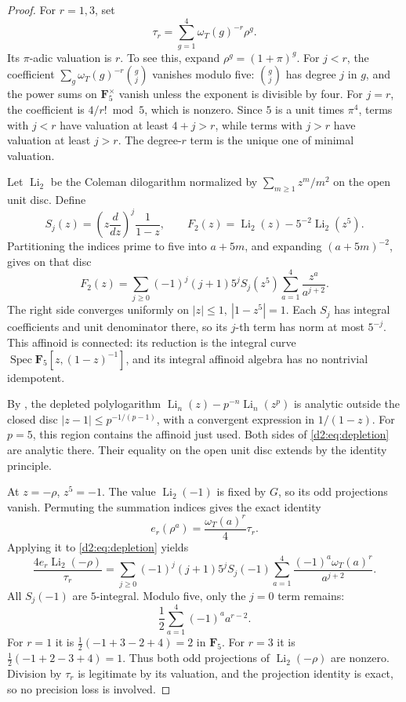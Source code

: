 \documentclass[11pt,a4paper]{amsart}
\numberwithin{equation}{section}
\theoremstyle{definition}
\theoremstyle{remark}
\newcommand{\DtwoFF}{\mathbf{F}}
\newcommand{\DtwoSpec}{\operatorname{Spec}}
\DeclareMathOperator{\DtwoLi}{Li}
\begin{document}
\begin{proof}
For \(r=1,3\), set
\[
 \tau_r=\sum_{g=1}^4\omega_T(g)^{-r}\rho^g.
\]
Its \(\pi\)-adic valuation is \(r\).
To see this, expand \(\rho^g=(1+\pi)^g\).
For \(j<r\), the coefficient
\(\sum_g\omega_T(g)^{-r}\binom gj\) vanishes modulo five:
\(\binom gj\) has degree \(j\) in \(g\), and the power sums on
\(\DtwoFF_5^\times\) vanish unless the exponent is divisible by four.
For \(j=r\), the coefficient is \(4/r!\bmod5\), which is nonzero.
Since \(5\) is a unit times \(\pi^4\), terms with \(j<r\)
have valuation at least \(4+j>r\), while terms with \(j>r\)
have valuation at least \(j>r\).
The degree-\(r\) term is the unique one of minimal valuation.

Let \(\DtwoLi_2\) be the Coleman dilogarithm normalized by
\(\sum_{m\ge1}z^m/m^2\) on the open unit disc.
Define
\[
 S_j(z)=\left(z\frac d{dz}\right)^j\frac1{1-z},
 \qquad
 F_2(z)=\DtwoLi_2(z)-5^{-2}\DtwoLi_2(z^5).
\]
Partitioning the indices prime to five into \(a+5m\), and expanding
\((a+5m)^{-2}\), gives on that disc
\begin{equation}\label{d2:eq:depletion}
 F_2(z)=
 \sum_{j\ge0}(-1)^j(j+1)5^jS_j(z^5)
       \sum_{a=1}^4\frac{z^a}{a^{j+2}}.
\end{equation}
The right side converges uniformly on
\(|z|\le1,\ |1-z^5|=1\).
Each \(S_j\) has integral coefficients and unit denominator there,
so its \(j\)-th term has norm at most \(5^{-j}\).
This affinoid is connected: its reduction is the integral curve
\(\DtwoSpec\DtwoFF_5[z,(1-z)^{-1}]\), and its integral affinoid algebra
has no nontrivial idempotent.

By \cite[Theorem~2.7(3)]{BesserDeJeuAlgorithm}, the depleted polylogarithm
\(\DtwoLi_n(z)-p^{-n}\DtwoLi_n(z^p)\) is analytic outside the closed disc
\(|z-1|\le p^{-1/(p-1)}\), with a convergent expression in
\(1/(1-z)\).
For \(p=5\), this region contains the affinoid just used.
Both sides of \eqref{d2:eq:depletion} are analytic there.
Their equality on the open unit disc extends by the identity
principle.

At \(z=-\rho\), \(z^5=-1\).
The value \(\DtwoLi_2(-1)\) is fixed by \(G\), so its odd projections
vanish.
Permuting the summation indices gives the exact identity
\[
 e_r(\rho^a)=\frac{\omega_T(a)^r}{4}\tau_r.
\]
Applying it to \eqref{d2:eq:depletion} yields
\begin{equation}\label{d2:eq:odd-dilogarithms}
 \frac{4e_r\DtwoLi_2(-\rho)}{\tau_r}
 =
 \sum_{j\ge0}(-1)^j(j+1)5^jS_j(-1)
    \sum_{a=1}^4\frac{(-1)^a\omega_T(a)^r}{a^{j+2}}.
\end{equation}
All \(S_j(-1)\) are \(5\)-integral.
Modulo five, only the \(j=0\) term remains:
\[
 \frac12\sum_{a=1}^4(-1)^aa^{r-2}.
\]
For \(r=1\) it is
\(\frac12(-1+3-2+4)=2\) in \(\DtwoFF_5\).
For \(r=3\) it is
\(\frac12(-1+2-3+4)=1\).
Thus both odd projections of \(\DtwoLi_2(-\rho)\) are nonzero.
Division by \(\tau_r\) is legitimate by its valuation, and the
projection identity is exact, so no precision loss is involved.


\end{proof}
\end{document}
